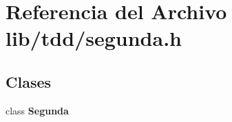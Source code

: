 \section{Referencia del Archivo lib/tdd/segunda.h}
\label{segunda_8h}
\subsection*{Clases}
\begin{DoxyCompactItemize}
\item 
class {\bf Segunda}
\end{DoxyCompactItemize}
